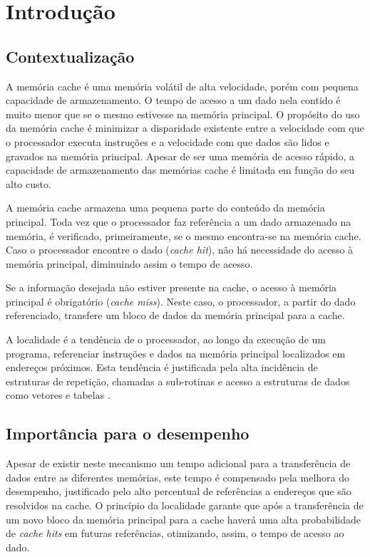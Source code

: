 \chapter{Introdução}
\label{cap:introducao}

\section{Contextualização}
A memória cache é uma memória volátil de alta velocidade, porém com pequena capacidade de armazenamento. O tempo de acesso a um dado nela contido é muito menor que se o mesmo estivesse na memória principal. O propósito do uso da memória cache é minimizar a disparidade existente entre a velocidade com que o processador executa instruções e a velocidade com que dados são lidos e gravados na memória principal. Apesar de ser uma memória de acesso rápido, a capacidade de armazenamento das memórias cache é limitada em função do seu alto custo.

A memória cache armazena uma pequena parte do conteúdo da memória principal. Toda vez que o processador faz referência a um dado armazenado na memória, é verificado, primeiramente, se o mesmo encontra-se na memória cache. Caso o processador encontre o dado (\textit{cache hit}), não há necessidade do acesso à memória principal, diminuindo assim o tempo de acesso.

Se a informação desejada não estiver presente na cache, o acesso à memória principal é obrigatório (\textit{cache miss}). Neste caso, o processador, a partir do dado referenciado, transfere um bloco de dados da memória principal para a cache.

A localidade é a tendência de o processador, ao longo da execução de um programa, referenciar instruções e dados na memória principal localizados em endereços próximos. Esta tendência é justificada pela alta incidência de estruturas de repetição, chamadas a sub-rotinas e acesso a estruturas de dados como vetores e tabelas \cite{machado2013}.

\section{Importância para o desempenho}
Apesar de existir neste mecanismo um tempo adicional para a transferência de dados entre as diferentes memórias, este tempo é compensado pela melhora do desempenho, justificado pelo alto percentual de referências a endereços que são resolvidos na cache. O princípio da localidade garante que após a transferência de um novo bloco da memória principal para a cache haverá uma alta probabilidade de \textit{cache hits} em futuras referências, otimizando, assim, o tempo de acesso ao dado.

